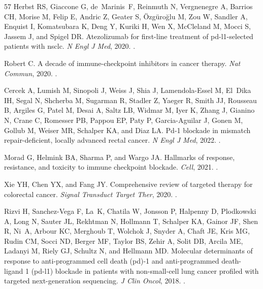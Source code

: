 \documentclass[11pt]{article}
\begin{document}
\begin{thebibliography}{57}
Herbst RS, Giaccone G, de~Marinis~F, Reinmuth N, Vergnenegre A, Barrios CH,
  Morise M, Felip E, Andric Z, Geater S, Özgüroğlu M, Zou W, Sandler A,
  Enquist I, Komatsubara K, Deng Y, Kuriki H, Wen X, McCleland M, Mocci S,
  Jassem J, and Spigel DR.
\newblock Atezolizumab for first-line treatment of pd-l1-selected patients with
  nsclc.
\newblock \emph{N Engl J Med}, 2020.
\newblock {}.

Robert C.
\newblock A decade of immune-checkpoint inhibitors in cancer therapy.
\newblock \emph{Nat Commun}, 2020.
\newblock {}.

Cercek A, Lumish M, Sinopoli J, Weiss J, Shia J, Lamendola-Essel M, El~Dika IH,
  Segal N, Shcherba M, Sugarman R, Stadler Z, Yaeger R, Smith JJ, Rousseau B,
  Argiles G, Patel M, Desai A, Saltz LB, Widmar M, Iyer K, Zhang J, Gianino N,
  Crane C, Romesser PB, Pappou EP, Paty P, Garcia-Aguilar J, Gonen M, Gollub M,
  Weiser MR, Schalper KA, and Diaz LA.
\newblock Pd-1 blockade in mismatch repair-deficient, locally advanced rectal
  cancer.
\newblock \emph{N Engl J Med}, 2022.
\newblock {}.

Morad G, Helmink BA, Sharma P, and Wargo JA.
\newblock Hallmarks of response, resistance, and toxicity to immune checkpoint
  blockade.
\newblock \emph{Cell}, 2021.
\newblock {}.

Xie YH, Chen YX, and Fang JY.
\newblock Comprehensive review of targeted therapy for colorectal cancer.
\newblock \emph{Signal Transduct Target Ther}, 2020.
\newblock {}.

Rizvi H, Sanchez-Vega F, La~K, Chatila W, Jonsson P, Halpenny D, Plodkowski A,
  Long N, Sauter JL, Rekhtman N, Hollmann T, Schalper KA, Gainor JF, Shen R,
  Ni~A, Arbour KC, Merghoub T, Wolchok J, Snyder A, Chaft JE, Kris MG, Rudin
  CM, Socci ND, Berger MF, Taylor BS, Zehir A, Solit DB, Arcila ME, Ladanyi M,
  Riely GJ, Schultz N, and Hellmann MD.
\newblock Molecular determinants of response to anti-programmed cell death
  (pd)-1 and anti-programmed death-ligand 1 (pd-l1) blockade in patients with
  non-small-cell lung cancer profiled with targeted next-generation sequencing.
\newblock \emph{J Clin Oncol}, 2018.
\newblock {}.


\end{thebibliography}
\end{document}
